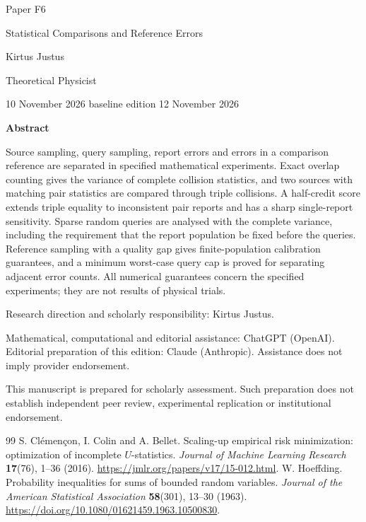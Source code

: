 \documentclass[11pt,a4paper]{article}
\begin{document}
\begin{titlepage}
{\small\sffamily \ProgramTitle\hfill Paper F6\par}
\vspace*{16mm}
{\LARGE\bfseries\raggedright{} Statistical Comparisons and Reference Errors\par}
\vspace{11mm}
{\large Kirtus Justus\par}
\vspace{1mm}
Theoretical Physicist\par
\AuthorLocation\par
\vspace{2mm}
10 November 2026 \textperiodcentered{} baseline edition 12 November 2026\par
\vspace{11mm}
\textbf{Abstract}\par
Source sampling, query sampling, report errors and errors in a comparison reference are separated in specified mathematical experiments. Exact overlap counting gives the variance of complete collision statistics, and two sources with matching pair statistics are compared through triple collisions. A half-credit score extends triple equality to inconsistent pair reports and has a sharp single-report sensitivity. Sparse random queries are analysed with the complete variance, including the requirement that the report population be fixed before the queries. Reference sampling with a quality gap gives finite-population calibration guarantees, and a minimum worst-case query cap is proved for separating adjacent error counts. All numerical guarantees concern the specified experiments; they are not results of physical trials.\par
\vfill
{\small Research direction and scholarly responsibility: Kirtus Justus.\par
Mathematical, computational and editorial assistance: ChatGPT (OpenAI). Editorial preparation of this edition: Claude (Anthropic).
Assistance does not imply provider endorsement.\par
This manuscript is prepared for scholarly assessment. Such preparation does not establish independent peer review,
experimental replication or institutional endorsement.\par}
\end{titlepage}
\setcounter{page}{2}
\setcounter{section}{3}

\clearpage
\begin{thebibliography}{99}
S. Cl\'emen\c{c}on, I. Colin and A. Bellet.
Scaling-up empirical risk minimization: optimization of incomplete $U$-statistics.
\emph{Journal of Machine Learning Research} \textbf{17}(76), 1--36 (2016).
\url{https://jmlr.org/papers/v17/15-012.html}.
W. Hoeffding. Probability inequalities for sums of bounded random variables.
\emph{Journal of the American Statistical Association} \textbf{58}(301), 13--30 (1963).
\url{https://doi.org/10.1080/01621459.1963.10500830}.
\end{thebibliography}
\end{document}
